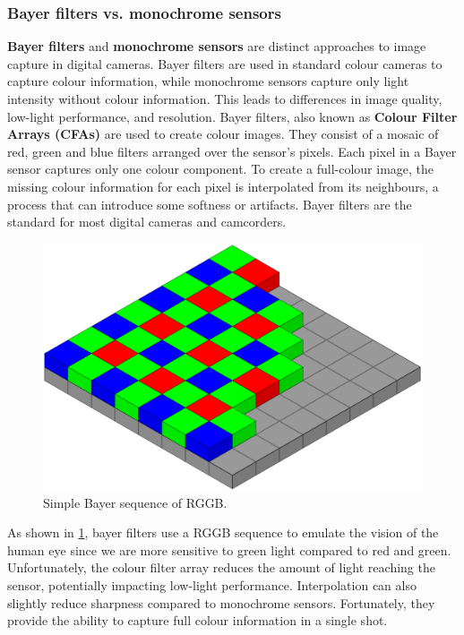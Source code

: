 \documentclass[10pt]{article}
\begin{document}
\begin{multicols}{2}
\subsubsection{Bayer filters vs. monochrome sensors}
\textbf{Bayer filters} and \textbf{monochrome sensors} are distinct approaches to image capture in digital cameras. Bayer filters are used in standard colour cameras to capture colour information, while monochrome sensors capture only light intensity without colour information. This leads to differences in image quality, low-light performance, and resolution.
\newline \newline
Bayer filters, also known as \textbf{Colour Filter Arrays (CFAs)} are used to create colour images. They consist of a mosaic of red, green and blue filters arranged over the sensor's pixels.
Each pixel in a Bayer sensor captures only one colour component. To create a full-colour image, the missing colour information for each pixel is interpolated from its neighbours, a process that can introduce some softness or artifacts.
Bayer filters are the standard for most digital cameras and camcorders.
\begin{figure}[H]
    \centering
    \includegraphics[width=0.8\linewidth]{Images/Week 1/bayer-pattern.png}
    \caption{Simple Bayer sequence of RGGB.}
    \label{fig:bayer-sequence}
\end{figure}
As shown in \ref{fig:bayer-sequence}, bayer filters use a RGGB sequence to emulate the vision of the human eye since we are more sensitive to green light compared to red and green.
Unfortunately, the colour filter array reduces the amount of light reaching the sensor, potentially impacting low-light performance. Interpolation can also slightly reduce sharpness compared to monochrome sensors.
Fortunately, they provide the ability to capture full colour information in a single shot.

\end{multicols}
\end{document}
